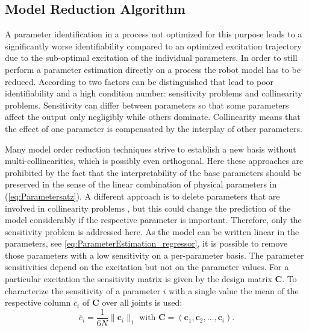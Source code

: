 
\subsection{Model Reduction Algorithm}
A parameter identification in a process not optimized for this purpose leads to a significantly worse identifiability compared to an optimized excitation trajectory due to the sub-optimal excitation of the individual parameters.
In order to still perform a parameter estimation directly on a process the robot model has to be reduced.
According to \cite{Brun2001} two factors can be distinguished that lead to poor identifiability and a high condition number: sensitivity problems and collinearity problems. 
Sensitivity can differ between parameters so that some parameters affect the output only negligibly while others dominate. Collinearity means that the effect of one parameter is compensated by the interplay of other parameters.

Many model order reduction techniques strive to establish a new basis without multi-collinearities, which is possibly even orthogonal. 
Here these approaches are prohibited by the fact that the interpretability of the base parameters should be preserved in the sense of the linear combination of physical parameters in (\ref{eq:Parametersatz}). 
A different approach is to delete parameters that are involved in collinearity problems \cite{Akinniyi2017}, but this could change the prediction of the model considerably if the respective parameter is important. Therefore, only the sensitivity problem is addressed here. As the model can be written linear in the parameters, see \eqref{eq:ParameterEstimation_regressor}, it is possible to remove those parameters with a low sensitivity on a per-parameter basis. The parameter sensitivities depend on the excitation but not on the parameter values. For a particular excitation the sensitivity matrix is given by the design matrix $\boldsymbol{C}$. To characterize the sensitivity of a parameter $i$ with a single value the mean of the respective column $\overline{c}_i$ of $\boldsymbol{C}$ over all joints is used:
\begin{equation}\label{eq:mean_Sensitivity}
	\overline{c}_i = \frac{1}{6N} \| \boldsymbol{c}_i \|_1 \text{ with } \boldsymbol{C} = (\boldsymbol{c}_1, \boldsymbol{c}_2, \hdots, \boldsymbol{c}_i).
\end{equation}

